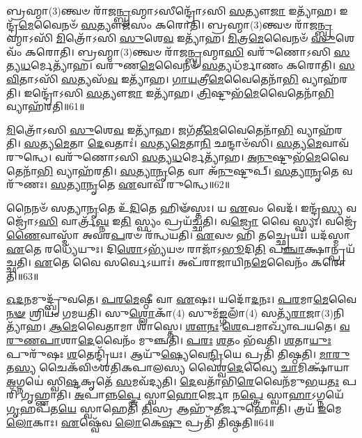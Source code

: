 𑌬𑍍𑌰𑌹𑍍𑌮𑌾(3)𑌨𑍍𑌤𑍍𑌵𑍞 𑌰𑌾᳴𑌜\-\ul{𑌨𑍍𑌬𑍍𑌰}\-𑌹𑍍𑌮𑌾\-𑌽𑌸𑍀𑌨𑍍𑌦𑍍𑌰𑍋᳴𑌽𑌸𑌿 \ul{𑌸}\-𑌤𑍍𑌯𑍗\-\ul{𑌜𑌾} 𑌇𑌤𑍍𑌯𑌾᳴𑌹।
𑌇𑌨𑍍𑌦𑍍𑌰᳴\-\ul{𑌮𑍇}\-𑌵𑍈𑌨𑍞᳴ \ul{𑌸}\-𑌤𑍍𑌯𑍗𑌜᳴𑌸𑌂 𑌕𑌰𑍋𑌤𑌿।
𑌬𑍍𑌰𑌹𑍍𑌮𑌾(3)𑌨𑍍𑌤𑍍𑌵𑍞 𑌰𑌾᳴𑌜\-\ul{𑌨𑍍𑌬𑍍𑌰}\-𑌹𑍍𑌮𑌾𑌽𑌸𑌿᳴ \ul{𑌮𑌿}\-𑌤𑍍𑌰𑍋᳴𑌽𑌸𑌿 \ul{𑌸𑍁}\-𑌶𑍇\-\ul{𑌵} 𑌇𑌤𑍍𑌯𑌾᳴𑌹।
\-\ul{𑌮𑌿}\-𑌤𑍍𑌰\-\ul{𑌮𑍇}\-𑌵𑍈𑌨𑍞᳴ \ul{𑌸𑍁}\-𑌶𑍇𑌵𑌂᳴ 𑌕𑌰𑍋𑌤𑌿।
𑌬𑍍𑌰𑌹𑍍𑌮𑌾(3)𑌨𑍍𑌤𑍍𑌵𑍞 𑌰𑌾᳴𑌜\-\ul{𑌨𑍍𑌬𑍍𑌰}\-𑌹𑍍𑌮𑌾\-\ul{𑌸𑌿} 𑌵𑌰𑍁᳴𑌣𑍋𑌽𑌸𑌿 \ul{𑌸}\-𑌤𑍍𑌯\-\ul{𑌧}\-𑌰𑍍𑌮𑍇𑌤𑍍𑌯𑌾᳴𑌹।
𑌵𑌰𑍁᳴𑌣\-\ul{𑌮𑍇}\-𑌵𑍈𑌨𑍞᳴ \ul{𑌸}\-𑌤𑍍𑌯𑌧᳴𑌰𑍍𑌮𑌾𑌣𑌂 𑌕𑌰𑍋𑌤𑌿।
\-\ul{𑌸}\-\-\ul{𑌵𑌿}\-𑌤𑌾𑌽𑌸𑌿᳴ \ul{𑌸}\-𑌤𑍍𑌯𑌸᳴\-\ul{𑌵} 𑌇𑌤𑍍𑌯𑌾᳴𑌹।
\-\ul{𑌗𑌾}\-\-\ul{𑌯}\-𑌤𑍍𑌰𑍀\-\ul{𑌮𑍇}\-𑌵𑍈𑌤𑍇𑌨𑌾᳴\-\ul{𑌭𑌿} 𑌵𑍍𑌯𑌾𑌹᳴𑌰𑌤𑌿।
𑌇𑌨𑍍𑌦𑍍𑌰𑍋᳴𑌽𑌸𑌿 \ul{𑌸}\-𑌤𑍍𑌯𑍗\-\ul{𑌜𑌾} 𑌇𑌤𑍍𑌯𑌾᳴𑌹।
\-\ul{𑌤𑍍𑌰𑌿}\-𑌷𑍍𑌟𑍁𑌭᳴\-\ul{𑌮𑍇}\-𑌵𑍈𑌤𑍇𑌨𑌾᳴\-\ul{𑌭𑌿} 𑌵𑍍𑌯𑌾𑌹᳴𑌰𑌤𑌿॥61॥

\-\ul{𑌮𑌿}\-𑌤𑍍𑌰𑍋᳴𑌽𑌸𑌿 \ul{𑌸𑍁}\-𑌶𑍇\-\ul{𑌵} 𑌇𑌤𑍍𑌯𑌾᳴𑌹।
𑌜𑌗᳴𑌤𑍀\-\ul{𑌮𑍇}\-𑌵𑍈𑌤𑍇𑌨𑌾᳴\-\ul{𑌭𑌿} 𑌵𑍍𑌯𑌾𑌹᳴𑌰𑌤𑌿।
\-\ul{𑌸}\-𑌤𑍍𑌯\-\ul{𑌮𑍇}\-𑌤𑌾 \ul{𑌦𑍇}\-𑌵𑌤𑌾𑌃॑।
\-\ul{𑌸}\-𑌤𑍍𑌯\-\ul{𑌮𑍇}\-𑌤𑌾\-\ul{𑌨𑌿} 𑌛𑌨𑍍𑌦𑌾𑍞᳴𑌸𑌿।
\-\ul{𑌸}\-𑌤𑍍𑌯\-\ul{𑌮𑍇}\-𑌵𑌾𑌵᳴ 𑌰𑍁𑌨𑍍𑌧𑍇।
𑌵𑌰𑍁᳴𑌣𑍋𑌽𑌸𑌿 \ul{𑌸}\-𑌤𑍍𑌯\-\ul{𑌧}\-𑌰𑍍𑌮𑍇𑌤𑍍𑌯𑌾᳴𑌹।
\-\ul{𑌅}\-\-\ul{𑌨𑍁}\-𑌷𑍍𑌟𑍁𑌭᳴\-\ul{𑌮𑍇}\-𑌵𑍈𑌤𑍇𑌨𑌾᳴\-\ul{𑌭𑌿} 𑌵𑍍𑌯𑌾𑌹᳴𑌰𑌤𑌿।
\-\ul{𑌸}\-\-\ul{𑌤𑍍𑌯𑌾}\-\-\ul{𑌨𑍃}\-𑌤𑍇 𑌵𑌾 𑌅᳴\-\ul{𑌨𑍁}\-𑌷𑍍𑌟𑍁𑌪𑍍।
\-\ul{𑌸}\-\-\ul{𑌤𑍍𑌯𑌾}\-\-\ul{𑌨𑍃}\-𑌤𑍇 𑌵𑌰𑍁᳴𑌣𑌃।
\-\ul{𑌸}\-\-\ul{𑌤𑍍𑌯𑌾}\-\-\ul{𑌨𑍃}\-𑌤𑍇 \ul{𑌏}\-𑌵𑌾𑌵᳴ 𑌰𑍁𑌨𑍍𑌧𑍇॥62॥

𑌨𑍈𑌨𑍞᳴ 𑌸𑌤𑍍𑌯𑌾\-\ul{𑌨𑍃}\-𑌤𑍇 𑌉᳴\-\ul{𑌦𑌿}\-𑌤𑍇 𑌹𑌿𑍟᳴𑌸𑍍𑌤𑌃।
𑌯 \ul{𑌏}\-𑌵𑌂 𑌵𑍇𑌦᳴।
𑌇𑌨𑍍𑌦𑍍𑌰᳴\-\ul{𑌸𑍍𑌯} 𑌵𑌜𑍍𑌰𑍋᳴𑌽\-\ul{𑌸𑌿} 𑌵𑌾𑌰𑍍𑌤𑍍𑌰᳴\-\ul{𑌘𑍍𑌨} 𑌇\-\ul{𑌤𑌿} 𑌸𑍍𑌫𑍍𑌯𑌂 𑌪𑍍𑌰𑌯᳴𑌚𑍍𑌛𑌤𑌿।
𑌵\-\ul{𑌜𑍍𑌰𑍋} 𑌵𑍈 𑌸𑍍𑌫𑍍𑌯𑌃।
𑌵𑌜𑍍𑌰𑍇᳴\-\ul{𑌣𑍈}\-𑌵𑌾𑌸𑍍𑌮𑌾᳴ 𑌅𑌵𑌰\-\ul{𑌪}\-𑌰𑍞 𑌰᳴𑌨𑍍𑌧𑌯𑌤𑌿।
\-\ul{𑌏}\-𑌵𑍞 𑌹𑌿 𑌤𑌚𑍍𑌛𑍍𑌰𑍇𑌯𑌃᳴।
𑌯𑌦᳴𑌸𑍍𑌮𑌾 \ul{𑌏}\-𑌤𑍇 𑌰𑌧𑍍𑌯𑍇᳴𑌯𑍁𑌃।
𑌦𑌿\-\ul{𑌶𑍋}\-\-𑌽𑌭𑍍𑌯᳴𑌯𑍞 𑌰𑌾𑌜𑌾᳴\-𑌽\-\ul{𑌭𑍂}\-𑌦𑌿\-\ul{𑌤𑌿} 𑌪\-\ul{𑌞𑍍𑌚𑌾}\-𑌕𑍍𑌷𑌾𑌨𑍍𑌪𑍍𑌰𑌯᳴𑌚𑍍𑌛𑌤𑌿।
\-\ul{𑌏}\-𑌤𑍇 𑌵𑍈 𑌸𑌰𑍍𑌵𑍇\-𑌽𑌯𑌾𑌃॑।
𑌅𑌪᳴𑌰𑌾𑌜𑌾𑌯𑌿𑌨\-\ul{𑌮𑍇}\-𑌵𑍈𑌨𑌂᳴ 𑌕𑌰𑍋𑌤𑌿॥63॥

\-\ul{𑌓}\-\-\ul{𑌦}\-𑌨𑌮𑍁𑌦𑍍𑌬𑍍𑌰𑍁᳴𑌵𑌤𑍇।
\-\ul{𑌪}\-\-\ul{𑌰}\-\-\ul{𑌮𑍇}\-𑌷𑍍𑌠𑍀 𑌵𑌾 \ul{𑌏}\-𑌷𑌃।
𑌯𑌦𑍋᳴\-\ul{𑌦}\-𑌨𑌃।
\-\ul{𑌪}\-\-\ul{𑌰}\-𑌮𑌾\-\ul{𑌮𑍇}\-𑌵𑍈\-\ul{𑌨}\-\-\ul{𑍟} 𑌶𑍍𑌰𑌿𑌯𑌂᳴ 𑌗𑌮𑌯𑌤𑌿।
𑌸𑍁\-\ul{𑌶𑍍𑌲𑍋}\-𑌕𑌾𑌁(4) 𑌸𑍁𑌮᳴\-\ul{𑌙𑍍𑌗}\-𑌲𑌾𑌁(4) 𑌸𑌤𑍍𑌯᳴\-\ul{𑌰𑌾}\-𑌜𑌾(3)\-𑌨𑌿𑌤𑍍𑌯𑌾᳴𑌹।
\-\ul{𑌆}\-\-\-\ul{𑌮𑍇}\-𑌵𑍈𑌤𑌾𑌮𑌾 𑌶𑌾॑𑌸𑍍𑌤𑍇।
\-\ul{𑌶𑍗}\-\-\ul{𑌨𑌃} \ul{𑌶𑍇}\-𑌪𑌮𑌾𑌖𑍍𑌯𑌾᳴𑌪𑌯𑌤𑍇।
\-\ul{𑌵}\-\-\ul{𑌰𑍁}\-\-\ul{𑌣}\-\-\ul{𑌪𑌾}\-𑌶𑌾\-\ul{𑌦𑍇}\-𑌵𑍈𑌨𑌂᳴ 𑌮𑍁𑌞𑍍𑌚𑌤𑌿।
\-\ul{𑌪}\-\-\ul{𑌰𑌃} \ul{𑌶}\-𑌤𑌂 𑌭᳴𑌵𑌤𑌿।
\-\ul{𑌶}\-𑌤𑌾\-\ul{𑌯𑍁𑌃} 𑌪𑍁𑌰𑍁᳴𑌷𑌃 \ul{𑌶}\-𑌤𑍇𑌨𑍍𑌦𑍍𑌰𑌿᳴𑌯𑌃।
𑌆𑌯𑍁᳴\-\ul{𑌷𑍍𑌯𑍇}\-𑌵𑍇\-\ul{𑌨𑍍𑌦𑍍𑌰𑌿}\-𑌯𑍇 𑌪𑍍𑌰𑌤𑌿᳴ 𑌤𑌿𑌷𑍍𑌠𑌤𑌿।
\-\ul{𑌮𑌾}\-\-\ul{𑌰𑍁}\-𑌤\-\ul{𑌸𑍍𑌯} 𑌚𑍈𑌕᳴𑌵𑌿𑍞𑌶𑌤𑌿𑌕𑌪𑌾𑌲𑌸𑍍𑌯 𑌵𑍈𑌶𑍍𑌵\-\ul{𑌦𑍇}\-𑌵𑍍𑌯𑍈 \ul{𑌚𑌾}\-𑌮𑌿𑌕𑍍𑌷𑌾᳴𑌯𑌾 \ul{𑌅}\-𑌗𑍍𑌨𑌯𑍇॑ 𑌸𑍍𑌵𑌿\-\ul{𑌷𑍍𑌟}\-𑌕𑍃𑌤𑍇᳴ \ul{𑌸}\-𑌮𑌵᳴𑌦𑍍𑌯𑌤𑌿।
\-\ul{𑌦𑍇}\-𑌵𑌤𑌾᳴𑌭𑌿\-\ul{𑌰𑍇}\-𑌵𑍈𑌨᳴𑌮𑍁\-\ul{𑌭}\-𑌯\-\ul{𑌤𑌃} 𑌪𑌰𑌿᳴ 𑌗𑍃𑌹𑍍𑌣𑌾𑌤𑌿।
\-\ul{𑌅}\-𑌪𑌾𑌨𑍍𑌨\-\ul{𑌪𑍍𑌤𑍍𑌰𑍇} 𑌸𑍍𑌵𑌾\-\ul{𑌹𑍋}\-𑌰𑍍𑌜𑍋 𑌨\-\ul{𑌪𑍍𑌤𑍍𑌰𑍇} 𑌸𑍍𑌵𑌾\-\ul{𑌹𑌾}\-\-𑌽𑌗𑍍𑌨𑌯𑍇᳴ \ul{𑌗𑍃}\-𑌹𑌪᳴𑌤\-\ul{𑌯𑍇} 𑌸𑍍𑌵𑌾𑌹𑍇𑌤𑌿᳴ \ul{𑌤𑌿}\-𑌸𑍍𑌰 𑌆𑌹𑍁᳴𑌤𑍀𑌰𑍍𑌜𑍁𑌹𑍋𑌤𑌿।
𑌤𑍍𑌰𑌯᳴ \ul{𑌇}\-𑌮𑍇 \ul{𑌲𑍋}\-𑌕𑌾𑌃।
\-\ul{𑌏}\-𑌷𑍍𑌵𑍇᳴𑌵 \ul{𑌲𑍋}\-𑌕𑍇\-\ul{𑌷𑍁} 𑌪𑍍𑌰𑌤𑌿᳴ 𑌤𑌿𑌷𑍍𑌠𑌤𑌿॥64॥\anuvakamend[\-\ul{𑌦𑍇}\-𑌵𑍈𑌰𑌿𑌤𑍍𑌯𑌾᳴𑌹 \ul{𑌸}\-𑌤𑍍𑌯𑌸᳴𑌵𑌂 𑌕𑌰𑍋𑌤𑌿 \ul{𑌤𑍍𑌰𑌿}\-𑌷𑍍𑌟𑍁𑌭᳴\-\ul{𑌮𑍇}\-𑌵𑍈𑌤𑍇𑌨𑌾᳴\-\ul{𑌭𑌿} 𑌵𑍍𑌯𑌾𑌹᳴𑌰𑌤𑌿 𑌸𑌤𑍍𑌯𑌾\-\ul{𑌨𑍃}\-𑌤𑍇 \ul{𑌏}\-𑌵𑌾𑌵᳴ 𑌰𑍁𑌨𑍍𑌧𑍇 𑌕𑌰𑍋𑌤𑌿 \ul{𑌶}\-𑌤𑍇𑌨𑍍𑌦𑍍𑌰𑌿᳴\-\ul{𑌯𑌃} 𑌷𑌟𑍍 𑌚᳴]




